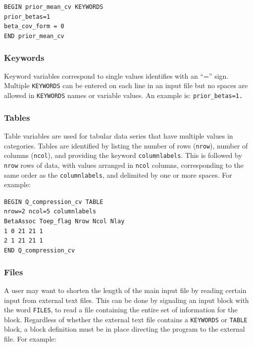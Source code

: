 \documentclass[11pt,oneside,onecolumn]{usgsreport}
\begin{document}
\begin{appendix}
\texttt{BEGIN prior\_mean\_cv KEYWORDS}~\\
\texttt{prior\_betas=1}~\\
\texttt{beta\_cov\_form = 0}~\\
\texttt{END prior\_mean\_cv}


\subsubsection{Keywords}

Keyword variables correspond to single values identifies with an ``=''
sign. Multiple \texttt{KEYWORDS} can be entered on each line in an
input file but no spaces are allowed in \texttt{KEYWORDS} names or
variable values. An example is: \texttt{prior\_betas=1.}


\subsubsection{Tables}

Table variables are used for tabular data series that have multiple
values in categories. Tables are identified by listing the number
of rows (\texttt{nrow}), number of columns (\texttt{ncol}), and providing
the keyword \texttt{columnlabels}. This is followed by \texttt{nrow}
rows of data, with values arranged in \texttt{ncol} columns, corresponding
to the same order as the \texttt{columnlabels}, and delimited by one
or more spaces. For example:

\texttt{BEGIN Q\_compression\_cv TABLE}~\\
\texttt{nrow=2 ncol=5 columnlabels }~\\
\texttt{BetaAssoc Toep\_flag Nrow Ncol Nlay }~\\
\texttt{1 0 21 21 1 }~\\
\texttt{2 1 21 21 1 }~\\
\texttt{END Q\_compression\_cv}


\subsubsection{Files }

A user may want to shorten the length of the main input file by reading
certain input from external text files. This can be done by signaling
an input block with the word \texttt{FILES}, to read a file containing
the entire set of information for the block. Regardless of whether
the external text file contains a \texttt{KEYWORDS} or \texttt{TABLE}
block, a block definition must be in place directing the program to
the external file. For example:


\end{appendix}
\end{document}
